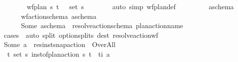 \begin{isabellebody}
\ \ \ \ \ \ \isamarkupfalse%
\ {\isacartoucheopen}wf{\isacharunderscore}{\kern0pt}plan\ {\isasympi}s{\isacartoucheclose}\ {\isacartoucheopen}{\isacharparenleft}{\kern0pt}t\isactrlsub {\isasympi}{\isacharcomma}{\kern0pt}\ {\isasympi}{\isacharparenright}{\kern0pt}\ {\isasymin}\ set\ {\isasympi}s{\isacartoucheclose}\isanewline
\ \ \ \ \ \ \isamarkupfalse%
\ {\isacharparenleft}{\kern0pt}auto\ simp{\isacharcolon}{\kern0pt}\ wf{\isacharunderscore}{\kern0pt}plan{\isacharunderscore}{\kern0pt}def{\isacharparenright}{\kern0pt}\isanewline
\ \ \ \ \isamarkupfalse%
\ \isamarkupfalse%
\ \isamarkupfalse%
\ a\isactrlsub s\isactrlsub c\isactrlsub h\isactrlsub e\isactrlsub m\isactrlsub a\ \isanewline
\ \ \ \ \ \ {\isachardoublequoteopen}wf{\isacharunderscore}{\kern0pt}action{\isacharunderscore}{\kern0pt}schema\ a\isactrlsub s\isactrlsub c\isactrlsub h\isactrlsub e\isactrlsub m\isactrlsub a{\isachardoublequoteclose}\isanewline
\ \ \ \ \ \ {\isachardoublequoteopen}Some\ a\isactrlsub s\isactrlsub c\isactrlsub h\isactrlsub e\isactrlsub m\isactrlsub a\ {\isacharequal}{\kern0pt}\ resolve{\isacharunderscore}{\kern0pt}action{\isacharunderscore}{\kern0pt}schema\ {\isacharparenleft}{\kern0pt}plan{\isacharunderscore}{\kern0pt}action{\isachardot}{\kern0pt}name\ {\isasympi}{\isacharparenright}{\kern0pt}{\isachardoublequoteclose}\isanewline
\ \ \ \ \ \ \isamarkupfalse%
\ {\isacharparenleft}{\kern0pt}cases\ {\isasympi}{\isacharparenright}{\kern0pt}\ {\isacharparenleft}{\kern0pt}auto\ split{\isacharcolon}{\kern0pt}\ option{\isachardot}{\kern0pt}splits\ dest{\isacharcolon}{\kern0pt}\ resolve{\isacharunderscore}{\kern0pt}action{\isacharunderscore}{\kern0pt}wf{\isacharparenright}{\kern0pt}\isanewline
\ \ \ \ \isamarkupfalse%
\ \isamarkupfalse%
\ {\isachardoublequoteopen}Some\ a\ {\isacharequal}{\kern0pt}\ res{\isacharunderscore}{\kern0pt}inst{\isacharunderscore}{\kern0pt}snap{\isacharunderscore}{\kern0pt}action\ {\isasympi}\ Over{\isacharunderscore}{\kern0pt}All{\isachardoublequoteclose}\isanewline
\ \ \ \ \ \ \isamarkupfalse%
\ {\isacharasterisk}{\kern0pt}\ {\isacartoucheopen}{\isacharparenleft}{\kern0pt}t\isactrlsub {\isasympi}{\isacharcomma}{\kern0pt}\ {\isasympi}{\isacharparenright}{\kern0pt}{\isasymin}set\ {\isasympi}s{\isacartoucheclose}\ {\isacartoucheopen}inst{\isacharunderscore}{\kern0pt}of{\isacharunderscore}{\kern0pt}plan{\isacharunderscore}{\kern0pt}action\ {\isasympi}s\ {\isacharparenleft}{\kern0pt}t\isactrlsub {\isasympi}{\isacharcomma}{\kern0pt}\ {\isasympi}{\isacharparenright}{\kern0pt}\ {\isacharparenleft}{\kern0pt}t\isactrlsub i{\isacharcomma}{\kern0pt}\ a{\isacharparenright}{\kern0pt}{\isacartoucheclose}\isanewline

\end{isabellebody}
